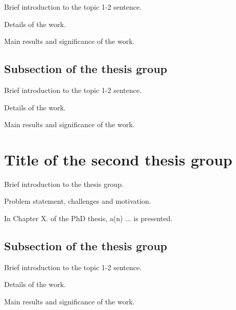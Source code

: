 \documentclass[12pt,a4paper]{extarticle}
\begin{document}

Brief introduction to the topic 1-2 sentence.

Details of the work.

Main results and significance of the work.

\subsection{Subsection of the thesis group}


Brief introduction to the topic 1-2 sentence.

Details of the work.

Main results and significance of the work.

\section{Title of the second thesis group}

Brief introduction to the thesis group.

Problem statement, challenges and motivation.

In Chapter X. of the PhD thesis, a(n) ... is presented.

\subsection{Subsection of the thesis group}


Brief introduction to the topic 1-2 sentence.

Details of the work.

Main results and significance of the work.
\end{document}
